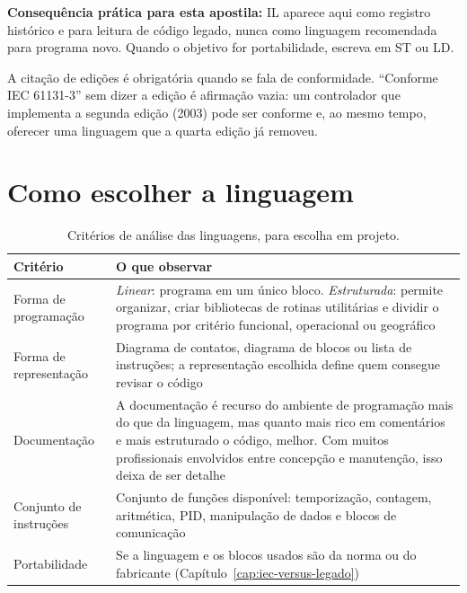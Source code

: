 \textbf{Consequência prática para esta apostila:} IL aparece aqui como registro histórico e para
leitura de código legado, nunca como linguagem recomendada para programa novo. Quando o objetivo for
portabilidade, escreva em ST ou LD.

\begin{atencao}
A citação de edições é obrigatória quando se fala de conformidade. ``Conforme IEC 61131-3'' sem dizer
a edição é afirmação vazia: um controlador que implementa a segunda edição (2003) pode ser conforme
e, ao mesmo tempo, oferecer uma linguagem que a quarta edição já removeu.
\end{atencao}


\section{Como escolher a linguagem}

\begin{table}[H]
  \centering
  \caption{Critérios de análise das linguagens, para escolha em projeto.}
  \label{tab:criterios-linguagem}
  \begin{tabular}{p{3.2cm} p{11.4cm}}
    \toprule
    Critério & O que observar \\
    \midrule
    Forma de programação
      & \emph{Linear}: programa em um único bloco. \emph{Estruturada}: permite organizar, criar
        bibliotecas de rotinas utilitárias e dividir o programa por critério funcional, operacional
        ou geográfico \\
    Forma de representação
      & Diagrama de contatos, diagrama de blocos ou lista de instruções; a representação escolhida
        define quem consegue revisar o código \\
    Documentação
      & A documentação é recurso do ambiente de programação mais do que da linguagem, mas quanto
        mais rico em comentários e mais estruturado o código, melhor. Com muitos profissionais
        envolvidos entre concepção e manutenção, isso deixa de ser detalhe \\
    Conjunto de instruções
      & Conjunto de funções disponível: temporização, contagem, aritmética, PID, manipulação de
        dados e blocos de comunicação \\
    Portabilidade
      & Se a linguagem e os blocos usados são da norma ou do fabricante (Capítulo~\ref{cap:iec-versus-legado}) \\
    \bottomrule
  \end{tabular}
\end{table}

